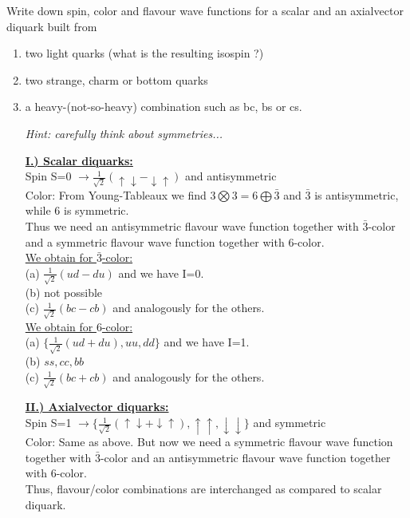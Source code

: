 

	Write down spin, color and flavour wave functions for a scalar and an axialvector diquark built from 

\begin{enumerate}
	\item two light quarks (what is the resulting isospin ?)
	\item two strange, charm or bottom quarks
	\item a heavy-(not-so-heavy) combination such as bc, bs or cs. 
	      
	{\em Hint: carefully think about symmetries...}
	
	\begin{solution}
	\underline{\bf I.) Scalar diquarks:}\\
	Spin S=0 $\rightarrow \frac{1}{\sqrt{2}} \left(	\uparrow \downarrow - \downarrow\uparrow \right)$ and antisymmetric\\
	Color: From Young-Tableaux we find $3 \bigotimes 3 = 6 \bigoplus \bar{3}$ and $\bar{3}$ is antisymmetric, while $6$ is symmetric.\\
	Thus we need an antisymmetric flavour wave function together with $\bar{3}$-color and a symmetric flavour wave function together with
	$6$-color.\\ 
	\underline{We obtain for $\bar{3}$-color:}\\
	(a) $ \frac{1}{\sqrt{2}} \left(	ud-du \right)$ and we have I=0.\\
	(b) not possible\\
	(c) $ \frac{1}{\sqrt{2}} \left(	bc-cb \right)$ and analogously for the others.\\ 
	\underline{We obtain for $6$-color:}\\
    (a) $\{ \frac{1}{\sqrt{2}} \left(	ud+du \right), uu, dd\}$ and we have I=1.\\
    (b) $ss, cc, bb$\\
    (c) $ \frac{1}{\sqrt{2}} \left(	bc+cb \right)$ and analogously for the others.\\\vspace*{-1mm} 
    
	\underline{\bf II.) Axialvector diquarks:}\\
    Spin S=1 $\rightarrow \{\frac{1}{\sqrt{2}} \left(	\uparrow \downarrow + \downarrow\uparrow \right), \uparrow\uparrow,\downarrow\downarrow \}$ and symmetric\\
    Color: Same as above. But now we need a symmetric flavour wave function together with $\bar{3}$-color and 
    an antisymmetric flavour wave function together with $6$-color.\\
    Thus, flavour/color combinations are interchanged as compared to scalar diquark. 
	\end{solution}
	
	
\end{enumerate}